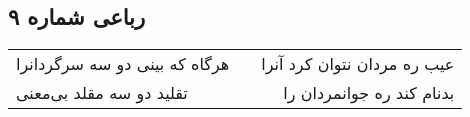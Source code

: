 \begin{center}
\section*{رباعی شماره ۹}
\label{sec:sh009}
\begin{longtable}{l p{0.5cm} r}
هرگاه که بینی دو سه سرگردانرا
&&
عیب ره مردان نتوان کرد آنرا
\\
تقلید دو سه مقلد بی‌معنی
&&
بدنام کند ره جوانمردان را
\\
\end{longtable}
\end{center}
